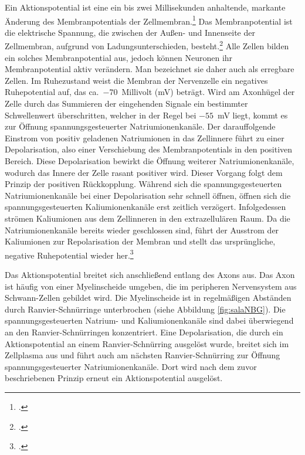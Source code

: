 \documentclass[a4paper, 12pt]{scrreprt}
\begin{document}
        Ein Aktionspotential ist eine ein bis zwei Millisekunden anhaltende,
        markante Änderung des Membranpotentials der
        Zellmembran.\footcite{Hircin2007}
        Das Membranpotential ist die elektrische Spannung, die zwischen der
        Außen- und Innenseite der Zellmembran, aufgrund von
        Ladungsunterschieden,
        besteht.\footcite{AntwerpesMembranpotential2006}
        Alle Zellen bilden ein solches Membranpotential aus, jedoch können
        Neuronen ihr Membranpotential aktiv verändern. Man bezeichnet sie daher
        auch als erregbare Zellen. Im Ruhezustand weist die Membran der
        Nervenzelle ein negatives Ruhepotential auf, das ca.\
        $-70$~Millivolt (mV) beträgt. Wird am Axonhügel der Zelle durch das
        Summieren der eingehenden Signale ein bestimmter Schwellenwert
        überschritten, welcher in der Regel bei $-55$~mV liegt, kommt es zur
        Öffnung spannungsgesteuerter Natriumionenkanäle. Der darauffolgende
        Einstrom von positiv geladenen Natriumionen in das Zellinnere führt zu
        einer Depolarisation, also einer Verschiebung des Membranpotentials in
        den positiven Bereich. Diese Depolarisation bewirkt die Öffnung weiterer
        Natriumionenkanäle, wodurch das Innere der Zelle rasant positiver wird.
        Dieser Vorgang folgt dem Prinzip der positiven Rückkopplung. Während
        sich die spannungsgesteuerten Natriumionenkanäle bei einer
        Depolarisation sehr schnell öffnen, öffnen sich die
        spannungsgesteuerten Kaliumionenkanäle erst zeitlich verzögert.
        Infolgedessen strömen Kaliumionen aus dem Zellinneren in den
        extrazellulären Raum. Da die Natriumionenkanäle bereits wieder
        geschlossen sind, führt der Ausstrom der Kaliumionen zur Repolarisation
        der Membran und stellt das ursprüngliche, negative Ruhepotential wieder
        her.\footcite[S.~1087--1089]{Markl1997}
        
        Das Aktionspotential breitet sich anschließend entlang des Axons aus.
        Das Axon ist häufig von einer Myelinscheide umgeben, die im peripheren
        Nervensystem aus Schwann-Zellen gebildet wird. Die Myelinscheide ist in
        regelmäßigen Abständen durch Ranvier-Schnürringe unterbrochen
        (siehe Abbildung \ref{fig:salaNBG}). Die spannungsgesteuerten Natrium- und
        Kaliumionenkanäle sind dabei überwiegend an den Ranvier-Schnürringen
        konzentriert. Eine Depolarisation, die durch ein Aktionspotential an
        einem Ranvier-Schnürring ausgelöst wurde, breitet sich im Zellplasma
        aus und führt auch am nächsten Ranvier-Schnürring zur Öffnung
        spannungsgesteuerter Natriumionenkanäle. Dort wird nach dem zuvor
        beschriebenen Prinzip erneut ein Aktionspotential ausgelöst.
        
\end{document}
